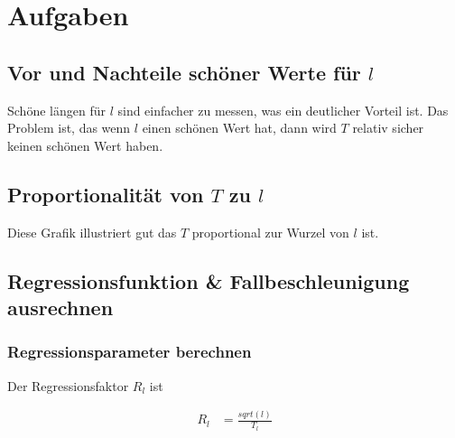 \documentclass[12pt, a4paper, twoside]{article}
\begin{document}
\section{Aufgaben}
\subsection{Vor und Nachteile schöner Werte für $l$}
Schöne längen für $l$ sind einfacher zu messen, was ein deutlicher Vorteil ist.
Das Problem ist, das wenn $l$ einen schönen Wert hat, dann wird $T$ relativ sicher keinen schönen Wert haben.

\subsection{Proportionalität von $T$ zu $l$}

\begin{center}
\end{center}


Diese Grafik illustriert gut das $T$ proportional zur Wurzel von $l$ ist.

\subsection{Regressionsfunktion \& Fallbeschleunigung ausrechnen}
\subsubsection{Regressionsparameter berechnen}
Der Regressionsfaktor $R_l$ ist

\begin{align*}
  R_l & = \frac{sqrt(l)}{T_l} \\
\end{align*}
\end{document}

